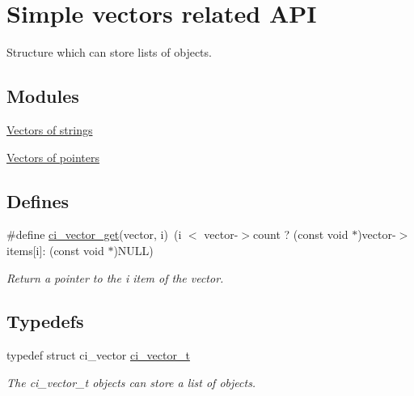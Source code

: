 \hypertarget{group__VECTORS}{
\section{Simple vectors related API}
\label{group__VECTORS}
}


Structure which can store lists of objects.  
\subsection*{Modules}
\begin{DoxyCompactItemize}
\item 
\hyperlink{group__STR__VECTORS}{Vectors of strings}
\item 
\hyperlink{group__PTR__VECTORS}{Vectors of pointers}
\end{DoxyCompactItemize}
\subsection*{Defines}
\begin{DoxyCompactItemize}
\item 
\hypertarget{group__VECTORS_gadc691877004571876c95ff5b1d1b387e}{
\#define \hyperlink{group__VECTORS_gadc691877004571876c95ff5b1d1b387e}{ci\_\-vector\_\-get}(vector, i)~(i $<$ vector-\/$>$count ? (const void $\ast$)vector-\/$>$items\mbox{[}i\mbox{]}:  (const void $\ast$)NULL)}
\label{group__VECTORS_gadc691877004571876c95ff5b1d1b387e}

\begin{DoxyCompactList}\small\item\em Return a pointer to the i item of the vector. \item\end{DoxyCompactList}\end{DoxyCompactItemize}
\subsection*{Typedefs}
\begin{DoxyCompactItemize}
\item 
typedef struct ci\_\-vector \hyperlink{group__VECTORS_ga911840034b768c5380eba22ad04d3c66}{ci\_\-vector\_\-t}
\begin{DoxyCompactList}\small\item\em The ci\_\-vector\_\-t objects can store a list of objects. \item\end{DoxyCompactList}\end{DoxyCompactItemize}
